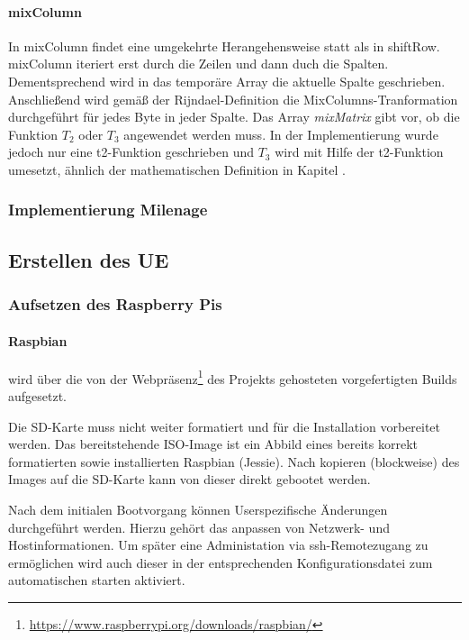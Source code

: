 		\paragraph{mixColumn}
		In mixColumn findet eine umgekehrte Herangehensweise statt als in shiftRow.
		mixColumn iteriert erst durch die Zeilen und dann duch die Spalten. Dementsprechend
		wird in das temporäre Array die aktuelle Spalte geschrieben. \\
		Anschließend wird gemäß der Rijndael-Definition die MixColumns-Tranformation
		durchgeführt für jedes Byte in jeder Spalte. Das Array \emph{mixMatrix} gibt vor,
		ob die Funktion $T_2$ oder $T_3$ angewendet werden muss. In der Implementierung
		wurde jedoch nur eine t2-Funktion geschrieben und $T_3$ wird mit Hilfe der 
		t2-Funktion umesetzt, ähnlich der mathematischen Definition in Kapitel
		.

	\subsubsection{Implementierung Milenage}

	\subsection{Erstellen des UE}
		\subsubsection{Aufsetzen des Raspberry Pis}
        \label{subsubsec:installpi}
			\paragraph{Raspbian} wird über die von der Webpräsenz\footnote{\url{https://www.raspberrypi.org/downloads/raspbian/}}
            des Projekts gehosteten vorgefertigten Builds aufgesetzt.

            Die SD-Karte muss nicht weiter formatiert und für die Installation vorbereitet werden. Das
            bereitstehende ISO-Image ist ein Abbild eines bereits korrekt formatierten sowie installierten
            Raspbian (Jessie). Nach kopieren (blockweise) des Images auf die SD-Karte kann von dieser direkt
            gebootet werden.

            Nach dem initialen Bootvorgang können Userspezifische Änderungen durchgeführt werden. Hierzu
            gehört das anpassen von Netzwerk- und Hostinformationen. Um später eine Administation via
            \ac{ssh}-Remotezugang zu ermöglichen wird auch dieser in der entsprechenden Konfigurationsdatei
            zum automatischen starten aktiviert.

